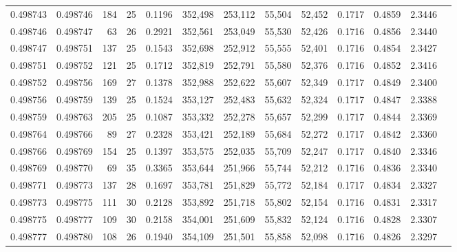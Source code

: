 \begin{tabular}{rrrrrrrrrrrrr}
0.498743 & 0.498746 & 184 &  25 &                                     0.1196 & 352,498 & 253,112 &  55,504 &  52,452 & 0.1717 & 0.4859 & 2.3446 \\
0.498746 & 0.498747 &  63 &  26 &                                     0.2921 & 352,561 & 253,049 &  55,530 &  52,426 & 0.1716 & 0.4856 & 2.3440 \\
0.498747 & 0.498751 & 137 &  25 &                                     0.1543 & 352,698 & 252,912 &  55,555 &  52,401 & 0.1716 & 0.4854 & 2.3427 \\
0.498751 & 0.498752 & 121 &  25 &                                     0.1712 & 352,819 & 252,791 &  55,580 &  52,376 & 0.1716 & 0.4852 & 2.3416 \\
0.498752 & 0.498756 & 169 &  27 &                                     0.1378 & 352,988 & 252,622 &  55,607 &  52,349 & 0.1717 & 0.4849 & 2.3400 \\
0.498756 & 0.498759 & 139 &  25 &                                     0.1524 & 353,127 & 252,483 &  55,632 &  52,324 & 0.1717 & 0.4847 & 2.3388 \\
0.498759 & 0.498763 & 205 &  25 &                                     0.1087 & 353,332 & 252,278 &  55,657 &  52,299 & 0.1717 & 0.4844 & 2.3369 \\
0.498764 & 0.498766 &  89 &  27 &                                     0.2328 & 353,421 & 252,189 &  55,684 &  52,272 & 0.1717 & 0.4842 & 2.3360 \\
0.498766 & 0.498769 & 154 &  25 &                                     0.1397 & 353,575 & 252,035 &  55,709 &  52,247 & 0.1717 & 0.4840 & 2.3346 \\
0.498769 & 0.498770 &  69 &  35 &                                     0.3365 & 353,644 & 251,966 &  55,744 &  52,212 & 0.1716 & 0.4836 & 2.3340 \\
0.498771 & 0.498773 & 137 &  28 &                                     0.1697 & 353,781 & 251,829 &  55,772 &  52,184 & 0.1717 & 0.4834 & 2.3327 \\
0.498773 & 0.498775 & 111 &  30 &                                     0.2128 & 353,892 & 251,718 &  55,802 &  52,154 & 0.1716 & 0.4831 & 2.3317 \\
0.498775 & 0.498777 & 109 &  30 &                                     0.2158 & 354,001 & 251,609 &  55,832 &  52,124 & 0.1716 & 0.4828 & 2.3307 \\
0.498777 & 0.498780 & 108 &  26 &                                     0.1940 & 354,109 & 251,501 &  55,858 &  52,098 & 0.1716 & 0.4826 & 2.3297 \\

\end{tabular}
